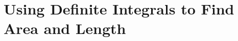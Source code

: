 \section{Using Definite Integrals to Find Area and Length} \label{S:6.1.Area}



\newpage



\newpage



\newpage



\newpage

\clearpage
